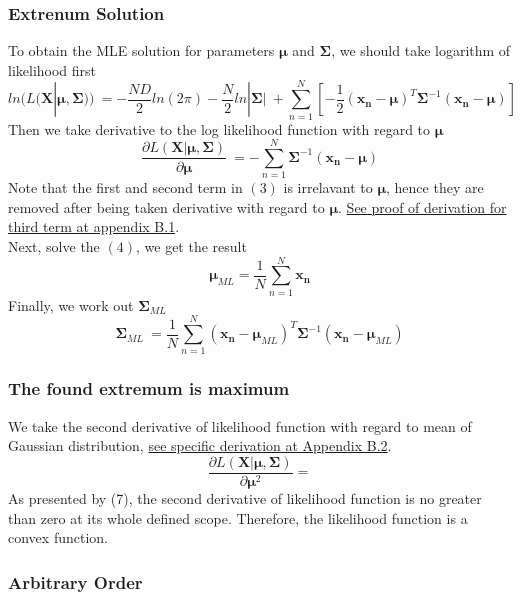 \documentclass[11pt,a4paper]{article}
\newcommand{\htab}{\hspace*{0.63cm}}
\newcommand{\bmu}{\boldsymbol{\mu}}
\newcommand{\bsum}{\boldsymbol{\Sigma}}
\newcommand{\xnv}{\boldsymbol{x_{n}}}
\begin{document}
\subsubsection{Extrenum Solution}
\htab To obtain the MLE solution for parameters $\bmu$ and $\bsum$, we should take logarithm of likelihood first
    \begin{equation}  ln(L(\boldsymbol{X}|\bmu,\bsum)) \
    = -\frac{ND}{2}ln(2\pi) - \frac{N}{2} ln|\bsum| \ 
        + \sum_{n=1}^{N} [-\frac{1}{2} (\xnv-\bmu)^{T} \bsum^{-1} (\xnv-\bmu)] \ 
    \end{equation}
\htab Then we take derivative to the log likelihood function with regard to $\bmu$
    \begin{equation}  \frac{ \partial L( \boldsymbol{X}| \bmu, \bsum )} { \partial \bmu}  \
        = -\sum_{n=1}^{N} \bsum^{-1}(\xnv - \bmu)
    \end{equation}
    \htab Note that the first and second term in $(3)$ is irrelavant to $\bmu$, hence they are removed after being taken derivative with regard to $\bmu$. \hyperlink{Derivation}{See proof of derivation for third term at appendix B.1}.  \\
\htab Next, solve the $(4)$, we get the result
    \begin{equation}  \bmu_{ML} = \frac{1}{N} \sum_{n=1}^{N} \xnv  \end{equation}
\htab Finally, we work out $\bsum_{ML}$
    \begin{equation}  
        \bsum_{ML} \
        = \frac{1}{N} \sum_{n=1}^{N} (\xnv - \bmu_{ML})^{T} \bsum^{-1} (\xnv - \bmu_{ML}) 
    \end{equation}
\subsubsection{The found extremum is maximum}
\htab We take the second derivative of likelihood function with regard to mean of Gaussian distribution, \hyperlink{DerivationB}{see specific derivation at Appendix B.2}.
    \begin{equation}  
        \frac{\partial L( \boldsymbol{X}| \bmu, \bsum )} { \partial \bmu^{2}} 
    = 
    \end{equation}
\htab As presented by (7), the second derivative of likelihood function is no greater than zero at its whole defined scope. Therefore, the likelihood function is a convex function. 
\subsubsection{Arbitrary Order}
\end{document}

